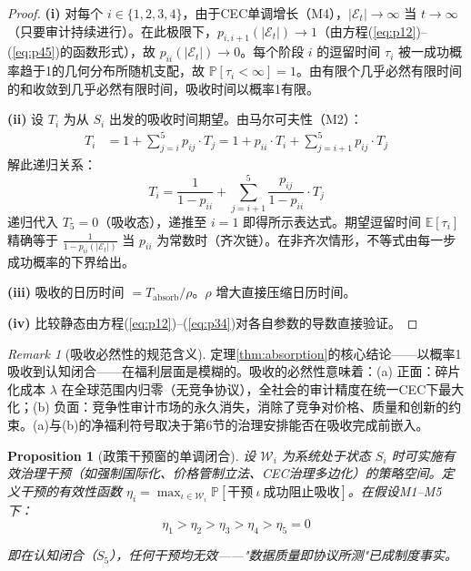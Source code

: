\documentclass[12pt,a4paper]{ctexart}
\newtheorem{proposition}[theorem]{Proposition}
\theoremstyle{definition}
\theoremstyle{remark}
\newtheorem{remark}{Remark}[section]
\begin{document}
\begin{proof}
\textbf{(i)} 对每个 $i \in \{1,2,3,4\}$，由于CEC单调增长（M4），$|\mathcal{E}_t| \to \infty$ 当 $t \to \infty$（只要审计持续进行）。在此极限下，$p_{i,i+1}(|\mathcal{E}_t|) \to 1$（由方程(\ref{eq:p12})--(\ref{eq:p45})的函数形式），故 $p_{ii}(|\mathcal{E}_t|) \to 0$。每个阶段 $i$ 的逗留时间 $\tau_i$ 被一成功概率趋于1的几何分布所随机支配，故 $\mathbb{P}[\tau_i < \infty] = 1$。由有限个几乎必然有限时间的和收敛到几乎必然有限时间，吸收时间以概率1有限。

\textbf{(ii)} 设 $T_i$ 为从 $S_i$ 出发的吸收时间期望。由马尔可夫性（M2）：
\begin{align}
T_i &= 1 + \sum_{j=i}^{5} p_{ij} \cdot T_j = 1 + p_{ii} \cdot T_i + \sum_{j=i+1}^{5} p_{ij} \cdot T_j
\end{align}
解此递归关系：
\begin{equation}
T_i = \frac{1}{1 - p_{ii}} + \sum_{j=i+1}^{5} \frac{p_{ij}}{1 - p_{ii}} \cdot T_j
\end{equation}
递归代入 $T_5 = 0$（吸收态），递推至 $i=1$ 即得所示表达式。期望逗留时间 $\mathbb{E}[\tau_i]$ 精确等于 $\frac{1}{1 - p_{ii}(|\mathcal{E}_t|)}$ 当 $p_{ii}$ 为常数时（齐次链）。在非齐次情形，不等式由每一步成功概率的下界给出。

\textbf{(iii)} 吸收的日历时间 $= T_{\text{absorb}} / \rho$。$\rho$ 增大直接压缩日历时间。

\textbf{(iv)} 比较静态由方程(\ref{eq:p12})--(\ref{eq:p34})对各自参数的导数直接验证。
\end{proof}

\begin{remark}[吸收必然性的规范含义]
定理\ref{thm:absorption}的核心结论——以概率1吸收到认知闭合——在福利层面是模糊的。吸收的必然性意味着：(a) 正面：碎片化成本 $\lambda$ 在全球范围内归零（无竞争协议），全社会的审计精度在统一CEC下最大化；(b) 负面：竞争性审计市场的永久消失，消除了竞争对价格、质量和创新的约束。(a)与(b)的净福利符号取决于第6节的治理安排能否在吸收完成前嵌入。
\end{remark}

\begin{proposition}[政策干预窗的单调闭合]
\label{prop:intervention-window}
设 $\mathcal{W}_i$ 为系统处于状态 $S_i$ 时可实施有效治理干预（如强制国际化、价格管制立法、CEC治理多边化）的策略空间。定义干预的有效性函数 $\eta_i = \max_{\iota \in \mathcal{W}_i} \mathbb{P}[\text{干预}\ \iota\ \text{成功阻止吸收}]$。在假设M1--M5下：
\begin{equation}
\eta_1 > \eta_2 > \eta_3 > \eta_4 > \eta_5 = 0
\label{eq:eta-ordering}
\end{equation}

即在认知闭合（$S_5$），任何干预均无效——"数据质量即协议所测"已成制度事实。
\end{proposition}
\end{document}
